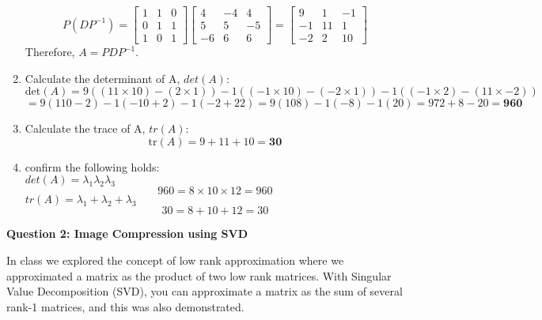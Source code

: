 \documentclass[12pt]{extarticle} %
\begin{document}
\begin{enumerate}
\[    \]
    \[
    P(DP^{-1}) = \begin{bmatrix} 1 & 1 & 0\\ 0 & 1 & 1 \\ 1 & 0 & 1 \end{bmatrix} \begin{bmatrix} 4 & -4 & 4\\ 5 & 5  & -5 \\ -6 & 6 & 6 \end{bmatrix} = \begin{bmatrix} 9 & 1 & -1\\ -1 & 11 & 1 \\ -2 & 2 & 10 \end{bmatrix}
    \]
    Therefore, \(A = PDP^{-1}\).
    \item Calculate the determinant of A, \(det(A)\):
    \[
    \text{det}(A) = 9((11 \times 10) - (2 \times 1)) - 1((-1 \times 10) - (-2 \times 1)) -1((-1 \times 2) - (11 \times -2))
    \]
    \[
    = 9(110 - 2) - 1(-10 + 2) -1(-2 + 22) = 9(108) - 1(-8) -1(20) = 972 + 8 - 20 = \textbf{960}
    \]
    
    \item Calculate the trace of A, \(tr(A)\):
    \[
    \text{tr}(A) = 9 + 11 + 10 = \textbf{30}
    \]
    \item  confirm the following holds: 
    \\ \(det(A) = \lambda_1 \lambda_2 \lambda_3\)
    \[
    960 = 8 \times 10 \times 12 = 960
    \]
    \(tr(A) = \lambda_1 + \lambda_2 + \lambda_3\)
    \[
    30 = 8 + 10 + 12 = 30
    \]
\end{enumerate}
\newpage
\begin{center}
    \large \textbf{Question 2: Image Compression using SVD}
\end{center}
In class we explored the concept of low rank approximation where we approximated a matrix as the product
of two low rank matrices. With Singular Value Decomposition (SVD), you can approximate a matrix as the
sum of several rank-1 matrices, and this was also demonstrated.
\end{document}
